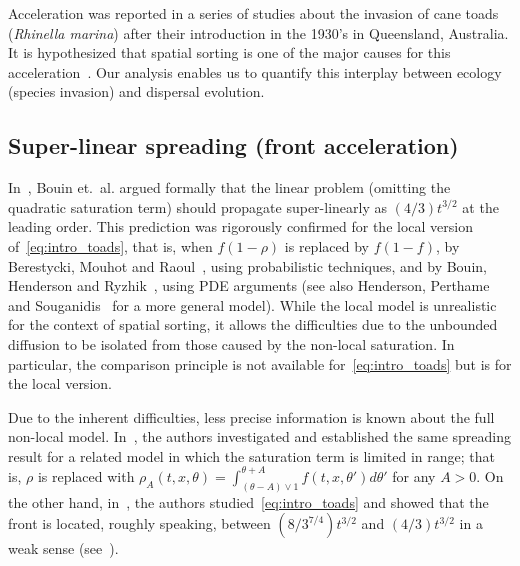\documentclass[10pt]{amsart}
\theoremstyle{definition}\newtheorem{defi}[theo]{Definition}\newtheorem{rema}[theo]{Remark}\newtheorem{exam}[theo]{Example}\newtheorem{exem}[theo]{Example}\newtheorem{nota}[theo]{Notation}
\newcommand{\1}{\mathds{1}}
\begin{document}
Acceleration was reported in a series of studies about the invasion of cane toads ({\em Rhinella marina}) \cite{phillips2006invasion, urban_toad_2008} after their introduction in the 1930's in Queensland, Australia. It is hypothesized that spatial sorting is one of the major causes for this acceleration~\cite{shine}. Our analysis enables us to quantify this interplay between ecology (species invasion) and dispersal evolution.



\subsection*{Super-linear spreading (front acceleration)}


In~\cite{BCMetal}, Bouin et.~al. argued formally that the linear problem (omitting the quadratic saturation term) should propagate super-linearly as $(4/3) t^{3/2}$ at the leading order. This prediction was rigorously confirmed for the local version of~\eqref{eq:intro_toads}, that is, when $f(1-\rho)$ is replaced by $f(1-f)$, by Berestycki, Mouhot and Raoul~\cite{BerestyckiMouhotRaoul}, using probabilistic techniques, and by Bouin, Henderson and Ryzhik~\cite{BHR_acceleration}, using PDE arguments (see also Henderson, Perthame and Souganidis~\cite{HendersonPerthameSouganidis} for a more general model). While the local model is unrealistic for the context of spatial sorting, it allows the difficulties due to the unbounded diffusion to be isolated from those caused by the non-local saturation. In particular, the comparison principle is not available for~\eqref{eq:intro_toads} but is for the local version.

Due to the inherent difficulties, less precise information is known about the full non-local model. In~\cite{BerestyckiMouhotRaoul}, the authors investigated and established the same spreading result for a related model in which the saturation term is limited in range; that is, $\rho$ is replaced with $\rho_A(t,x,\theta) = \int_{(\theta-A)\vee 1}^{\theta+A} f(t,x,\theta')d\theta'$ for any $A>0$. On the other hand, in~\cite{BHR_acceleration}, the authors studied~\eqref{eq:intro_toads} and showed that the front is located, roughly speaking, between $(8/3^{7/4}) t^{3/2}$ and $(4/3) t^{3/2}$ in a weak sense (see~\cite[Theorem~1.2]{BHR_acceleration}).
\end{document}
